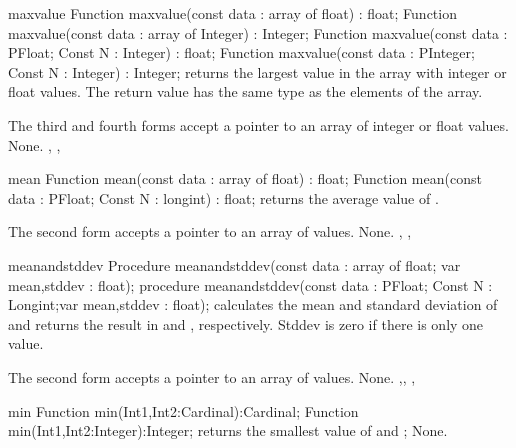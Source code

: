 

\begin{function}{maxvalue}
\Declaration
Function maxvalue(const data : array of float) : float;
Function maxvalue(const data : array of Integer) : Integer;
Function maxvalue(const data : PFloat; Const N : Integer) : float;
Function maxvalue(const data : PInteger; Const N : Integer) : Integer;
\Description
{} returns the largest value in the  
array with integer or float values. The return value has 
the same type as the elements of the array.

The third and fourth forms accept a pointer to an array of  
integer or float values.
\Errors
None.
\SeeAlso
{}, , 
\end{function}


\begin{function}{mean}
\Declaration
Function mean(const data : array of float) : float;
Function mean(const data : PFloat; Const N : longint) : float;
\Description
{} returns the average value of .

The second form accepts a pointer to an array of  values.
\Errors
None.
\SeeAlso
{}, , 
\end{function}


\begin{procedure}{meanandstddev}
\Declaration
Procedure meanandstddev(const data : array of float; 
                        var mean,stddev : float);
procedure meanandstddev(const data : PFloat;
  Const N : Longint;var mean,stddev : float);
\Description
{} calculates the mean and standard deviation of 
and returns the result in  and , respectively.
Stddev is zero if there is only one value.

The second form accepts a pointer to an array of  values.
\Errors
None.
\SeeAlso
{},, , 
\end{procedure}



\begin{function}{min}
\Declaration
Function min(Int1,Int2:Cardinal):Cardinal;
Function min(Int1,Int2:Integer):Integer;
\Description
{} returns the smallest value of  and ;
\Errors
None.
\SeeAlso
{}
\end{function}

